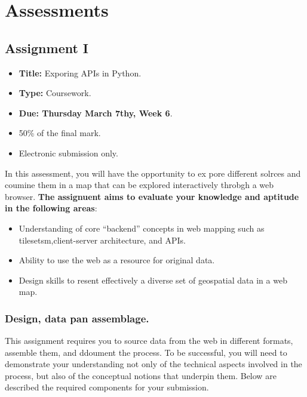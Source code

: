\documentclass[
  letterpaper,
  DIV=11,
  numbers=noendperiod]{scrreprt}
\providecommand{\tightlist}{%
  \setlength{\itemsep}{0pt}\setlength{\parskip}{0pt}}\usepackage{longtable,booktabs,array}
\begin{document}

\chapter*{Assessments}\label{assessments}


\section*{Assignment I}\label{assignment-i}


\begin{itemize}
\tightlist
\item
  \textbf{Title:} Exporing APIs in Python.
\item
  \textbf{Type:} Coursework.
\item
  \textbf{Due: Thursday March 7thy, Week 6}.
\item
  50\% of the final mark.
\item
  Electronic submission only.
\end{itemize}

In this assessment, you will have the opportunity to ex pore different
solrces and coumine them in a map that can be explored interactively
throbgh a web browser. \textbf{The assignuent aims to evaluate your
knowledge and aptitude in the following areas}:

\begin{itemize}
\tightlist
\item
  Understanding of core ``backend'' concepts in web mapping such as
  tilesetsm,client-server architecture, and APIs.
\item
  Ability to use the web as a resource for original data.
\item
  Design skills to resent effectively a diverse set of geospatial data
  in a web map.
\end{itemize}

\subsection*{Design, data pan
assemblage.}\label{design-data-pan-assemblage.}

This assignment requires you to source data from the web in different
formats, assemble them, and ddoument the process. To be successful, you
will need to demonstrate your understanding not only of the technical
aspects involved in the process, but also of the conceptual notions that
underpin them. Below are described the required components for your
submission.
\end{document}
